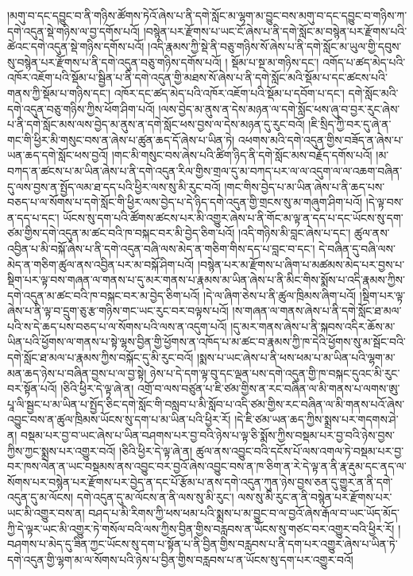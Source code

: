 །མགུ་བ་དང་དབྱུང་བ་ནི་གཉིས་ཚོགས་ཏེའོ་ཞེས་པ་ནི་དགེ་སློང་མ་ལྷག་མ་བྱུང་བས་མགུ་བ་དང་དབྱུང་བ་གཉིས་ཀ་དགེ་འདུན་སྡེ་གཉིས་ལ་བྱ་དགོས་པའོ། །བསྙེན་པར་རྫོགས་པ་ཡང་ངོ་ཞེས་པ་ནི་དགེ་སློང་མ་བསྙེན་པར་རྫོགས་པའི་ཚེའང་དགེ་འདུན་སྡེ་གཉིས་དགོས་པའོ། །འདི་རྣམས་ཀྱི་སྡེ་ནི་བཅུ་གཉིས་སོ་ཞེས་པ་ནི་དགེ་སློང་མ་ཡུལ་གྱི་དབུས་སུ་བསྙེན་པར་རྫོགས་པ་ནི་དགེ་འདུན་བཅུ་གཉིས་དགོས་པའོ། །
སྡོམ་པ་སྔ་མ་གཉིས་དང་། འགོད་པ་ཚད་མེད་པའི་འཁོར་འཇོག་པའི་སྡོམ་པ་སྦྱིན་པ་ནི་དགེ་འདུན་གྱི་མཐས་སོ་ཞེས་པ་ནི་དགེ་སློང་མའི་སྡོམ་པ་དང་ཚངས་པའི་གནས་ཀྱི་སྡོམ་པ་གཉིས་དང་། འཁོར་དང་ཚད་མེད་པའི་འཁོར་འཇོག་པའི་སྡོམ་པ་དབོག་པ་དང་། དགེ་སློང་མའི་དགེ་འདུན་བཅུ་གཉིས་ཀྱིས་ཕོག་ཤིག་པའོ། །ལས་བྱེད་མ་ནུས་ན་དེས་མཉན་ལ་དགེ་སློང་ཕས་ཞུ་བ་བྱར་རུང་ཞེས་པ་ནི་དགེ་སློང་མས་ལས་བྱེད་མ་ནུས་ན་དགེ་སློང་ཕས་བྱས་ལ་དེས་མཉན་དུ་རུང་བའོ། །ཇི་སྲིད་ཀྱི་བར་དུ་ཞེ་ན་གང་གི་ཕྱིར་མི་གསུང་བས་ན་ཞེས་པ་ཚུན་ཆད་དོ་ཞེས་པ་ཡིན་ཏེ། འཕགས་མའི་དགེ་འདུན་གྱིས་བཟོད་ན་ཞེས་པ་ཡན་ཆད་དགེ་སློང་ཕས་བྱའོ། །གང་མི་གསུང་བས་ཞེས་པའི་ཚིག་ཉིད་ནི་དགེ་སློང་མས་བརྗོད་དགོས་པའོ། །མ་བཀད་ན་ཚངས་པ་མ་ཡིན་ཞེས་པ་ནི་དགེ་འདུན་རིལ་གྱིས་གྲལ་དུ་མ་བཀད་པར་ལ་ལ་འདུག་ལ་ལ་འཆག་བཞིན་དུ་ལས་བྱས་ན་སྤྱོད་ལམ་ཐ་དད་པའི་ཕྱིར་ལས་སུ་མི་རུང་བའོ། །གང་གིས་བྱེད་པ་མ་ཡིན་ཞེས་པ་ནི་ཆད་པས་བཅད་པ་ལ་སོགས་པ་དགེ་སློང་གི་ཕྱིར་ལས་བྱེད་པ་དེ་ཉིད་དགེ་འདུན་གྱི་གྲངས་སུ་མ་གཞུག་ཤིག་པའོ། །དེ་ལྟ་བས་ན་དད་པ་དང་། ཡོངས་སུ་དག་པའི་ཚོགས་ཚངས་པར་མི་འགྱུར་ཞེས་པ་ནི་གོང་མ་ལྟ་ན་དད་པ་དང་ཡོངས་སུ་དག་ཙམ་གྱིས་དགེ་འདུན་མ་ཚང་བའི་ཁ་བསྐང་བར་མི་བྱེད་ཅིག་པའོ། །འདི་གཉིས་མི་བླང་ཞེས་པ་དང་། ཚུལ་ནས་འབྱིན་པ་མི་བསྐོ་ཞེས་པ་ནི་དགེ་འདུན་བཞི་ལས་མེད་ན་གཅིག་གིས་དད་པ་བླང་བ་དང་། དེ་བཞིན་དུ་བཞི་ལས་མེད་ན་གཅིག་ཚུལ་ནས་འབྱིན་པར་མ་བསྐོ་ཤིག་པའོ། །བསྙེན་པར་མ་རྫོགས་པ་ཞིག་པ་མཚམས་མེད་པར་བྱས་པ་སྡིག་པར་ལྟ་བས་གཞན་ལ་གནས་པ་དུ་མར་གནས་པ་རྣམས་མ་ཡིན་ཞེས་པ་ནི་མིང་གིས་སྨོས་པ་འདི་རྣམས་ཀྱིས་དགེ་འདུན་མ་ཚང་བའི་ཁ་བསྐང་བར་མ་བྱེད་ཅིག་པའོ། །དེ་ལ་ཞིག་ཅེས་པ་ནི་ཚུལ་ཁྲིམས་ཞིག་པའོ། །སྡིག་པར་ལྟ་ཞེས་པ་ནི་ལྟ་བ་དྲུག་ཅུ་རྩ་གཉིས་གང་ཡང་རུང་བར་བལྟས་པའོ། །ས་གཞན་ལ་གནས་ཞེས་པ་ནི་དགེ་སློང་ཐ་མལ་པའི་ས་དེ་ཆད་པས་བཅད་པ་ལ་སོགས་པའི་ལས་ན་འདུག་པའོ། །དུ་མར་གནས་ཞེས་པ་ནི་སྐབས་འདིར་ཆོས་མ་ཡིན་པའི་ཕྱོགས་ལ་གནས་པ་སྟེ་ལྷས་བྱིན་གྱི་ཕྱོགས་ན་འཁོད་པ་མ་ཚང་བ་རྣམས་ཀྱི་ཁ་དེའི་ཕྱོགས་སུ་མ་སྦོང་བའི་དགེ་སློང་ཐ་མལ་པ་རྣམས་ཀྱིས་བསྐོང་དུ་མི་རུང་བའོ། །སྨས་པ་ཡང་ཞེས་པ་ནི་ཕས་ཕམ་པ་མ་ཡིན་པའི་ལྷག་མ་མན་ཆད་ཉེས་པ་བཞིན་བྱས་པ་ལ་བྱ་སྟེ། ཉེས་པ་དེ་དག་ལྟ་བུ་དང་ལྡན་པས་དགེ་འདུན་གྱི་ཁ་བསྐང་དུའང་མི་རུང་བར་སྟོན་པའོ། །ཅིའི་ཕྱིར་དེ་ལྟ་ཞེ་ན། འགྲོ་བ་ལས་བཙུན་པ་ཇི་ཙམ་གྱིས་ན་རང་བཞིན་ལ་མི་གནས་པ་ལགས་ཨུ་པཱ་ལི་སྦྱང་པ་མ་ཡིན་པ་སྤྱོད་ཅིང་དགེ་སློང་གི་བསླབ་པ་མི་སློབ་པ་འདི་ཙམ་གྱིས་རང་བཞིན་ལ་མི་གནས་པའོ་ཞེས་འབྱུང་བས་ན་ཚུལ་ཁྲིམས་ཡོངས་སུ་དག་པ་མ་ཡིན་པའི་ཕྱིར་རོ། །དེ་ཇི་ཙམ་ཡན་ཆད་ཀྱིས་སྨྲས་པར་གདགས་ཤེ་ན། བསྡམ་པར་བྱ་བ་ཡང་ཞེས་པ་ཡིན་བཤགས་པར་བྱ་བའི་ཉེས་པ་ལྟ་ཅི་སྨོས་ཀྱིས་བསྡམ་པར་བྱ་བའི་ཉེས་བྱས་ཀྱིས་ཀྱང་སྨྲས་པར་འགྱུར་བའོ། །ཅིའི་ཕྱིར་དེ་ལྟ་ཞེ་ན། ཚུལ་ནས་འབྱུང་བའི་དངོས་པོ་ལས་འགལ་ཏེ་བསྡམ་པར་བྱ་བར་ཁས་ལེན་ན་ཡང་བསྡམས་ནས་འབྱུང་བར་བྱའོ་ཞེས་འབྱུང་བས་ན་ཁ་ཅིག་ན་རེ་དེ་ལྟ་ན་ནི་རྣ་རྡུམ་དང་ནད་ལ་སོགས་པར་བསྙེན་པར་རྫོགས་པར་བྱེད་ན་དང་པོ་རྩོམ་པ་ནས་དགེ་འདུན་ཀུན་ཉེས་བྱས་ཅན་དུ་གྱུར་ན་ནི་དགེ་འདུན་དུ་མ་ལོངས། དགེ་འདུན་དུ་མ་ལོངས་ན་ནི་ལས་སུ་མི་རུང་། ལས་སུ་མི་རུང་ན་ནི་བསྙེན་པར་རྫོགས་པར་ཡང་མི་འགྱུར་བས་ན། བཤད་པ་མི་རིགས་ཀྱི་ཕས་ཕམ་པའི་སྨྲས་པ་མ་བྱུང་བ་ལ་བྱའོ་ཞེས་རྒོལ་བ་ཡང་ཡོད་མོད་ཀྱི་དེ་ལྟར་ཡང་མི་འགྱུར་ཏེ་གསོལ་བའི་ལས་ཀྱིས་བྱིན་གྱིས་བརླབས་ན་ཡོངས་སུ་གཙང་བར་འགྱུར་བའི་ཕྱིར་རོ། །བཤགས་པ་མེད་དུ་ཟིན་ཀྱང་ཡོངས་སུ་དག་པ་སྟོན་པ་ནི་བྱིན་གྱིས་བརླབས་པ་ནི་དག་པར་འགྱུར་ཞེས་པ་ཡིན་ཏེ་དགེ་འདུན་གྱི་ལྷག་མ་ལ་སོགས་པའི་ཉེས་པ་བྱིན་གྱིས་བརླབས་པ་ན་ཡོངས་སུ་དག་པར་འགྱུར་བའོ། 